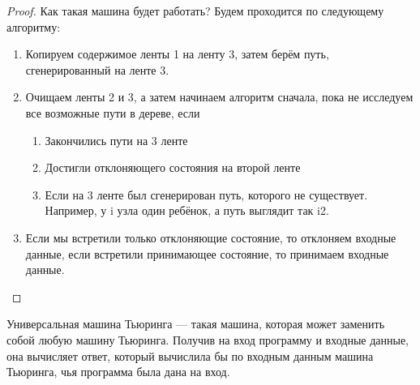 \begin{proof}
        \par Как такая машина будет работать? Будем проходится по следующему алгоритму:
        \begin{enumerate}
            \item Копируем содержимое ленты 1 на ленту 3, затем берём путь, сгенерированный на ленте 3.
            \item Очищаем ленты 2 и 3, а затем начинаем алгоритм сначала, пока не исследуем все возможные пути в дереве, если
                \begin{enumerate}
                    \item Закончились пути на 3 ленте
                    \item Достигли отклоняющего состояния на второй ленте
                    \item Если на 3 ленте был сгенерирован путь, которого не существует. Например, у i узла один ребёнок, а путь выглядит так i2.
                \end{enumerate}
            \item Если мы встретили только отклоняющие состояние, то отклоняем входные данные, если встретили принимающее состояние, то принимаем входные данные.
        \end{enumerate}
    \end{proof}

        
    \begin{Def} Универсальная машина Тьюринга ---        такая машина, которая может заменить собой любую машину Тьюринга. Получив на     вход программу и входные данные, она вычисляет ответ, который вычислила бы по      входным данным машина Тьюринга, чья программа была дана на вход.
    \end{Def}
    \begin{Def} 
    \end{Def}

